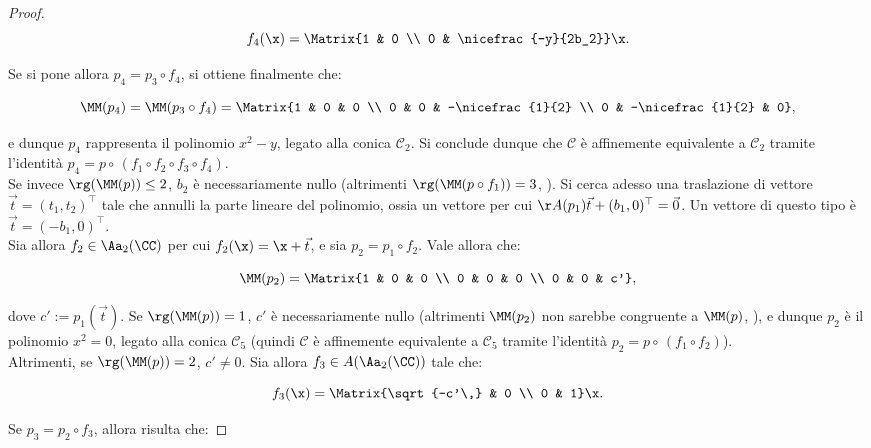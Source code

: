 \documentclass[11pt]{article}
\begin{document}
\begin{proof}
		\[ f_4(\x) = \Matrix{1 & 0 \\ 0 & \nicefrac{-y}{2b_2}} \x. \]
		
		\vskip 0.05in
		
		Se si pone allora $p_4 = p_3 \circ f_4$, si ottiene
		finalmente che:
		
		\[ \MM(p_4) = \MM(p_3 \circ f_4) = \Matrix{1 & 0 & 0 \\ 0 & 0 & -\nicefrac{1}{2} \\ 0 & -\nicefrac{1}{2} & 0}, \]
		
		\vskip 0.05in
		
		e dunque $p_4$ rappresenta il polinomio $x^2 - y$,
		legato alla conica $\mathcal{C}_2$. Si conclude dunque
		che $\mathcal{C}$ è affinemente equivalente a $\mathcal{C}_2$
		tramite l'identità $p_4 = p \circ \, (f_1 \circ f_2 \circ f_3 \circ f_4)$. \\
		
		Se invece $\rg(\MM(p)) \leq 2$, $b_2$ è necessariamente
		nullo (altrimenti $\rg(\MM(p \circ f_1)) = 3$, \Lightning).
		Si cerca adesso una traslazione di vettore $\vec t = (t_1, t_2)^\top$
		tale che annulli la parte lineare del polinomio, ossia
		un vettore per cui $\AA(p_1) \vec t + (b_1, 0)^\top = \vec 0$. Un vettore di questo tipo è $\vec t = (-b_1, 0)^\top$. \\
		
		Sia allora $f_2 \in \Aa_2(\CC)$ per cui $f_2(\x) = \x + \vec t$, e sia $p_2 = p_1 \circ f_2$. Vale allora che:
		
		\[ \MM(p_2) = \Matrix{1 & 0 & 0 \\ 0 & 0 & 0 \\ 0 & 0 & c'}, \]
		
		\vskip 0.05in
		
		dove $c' := p_1(\vec t)$. Se $\rg(\MM(p)) = 1$,
		$c'$ è necessariamente nullo (altrimenti $\MM(p_2)$ non
		sarebbe congruente a $\MM(p)$, \Lightning), e dunque
		$p_2$ è il polinomio $x^2 = 0$, legato alla conica $\mathcal{C}_5$ (quindi $\mathcal{C}$ è affinemente equivalente a $\mathcal{C}_5$ tramite l'identità $p_2 = p \circ \, (f_1 \circ f_2)$). \\
		
		Altrimenti, se $\rg(\MM(p)) = 2$, $c' \neq 0$. Sia
		allora $f_3 \in A(\Aa_2(\CC))$ tale che:
		
		\[ f_3(\x) = \Matrix{\sqrt{-c'\,} & 0 \\ 0 & 1} \x. \]
		
		\vskip 0.05in
		
		Se $p_3 = p_2 \circ f_3$, allora risulta che:
		

\end{proof}
\end{document}
